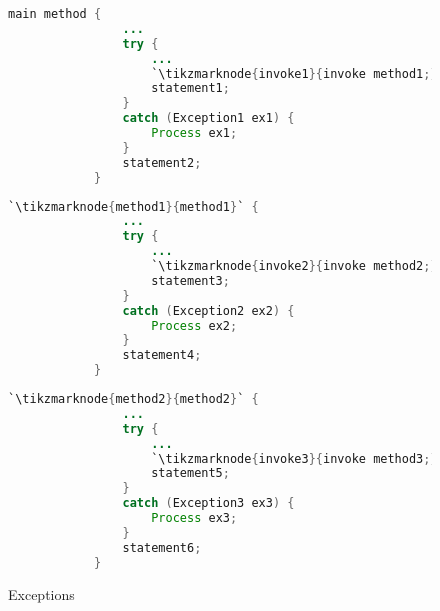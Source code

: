 \documentclass[11pt]{article}
\begin{document}
		\begin{figure}[h!]
			\caption{Exceptions}
	\begin{minipage}{0.28\textwidth}
		\begin{lstlisting}[language=java, frame=single, escapechar=`]
			main method {
				...
				try {
					...
					`\tikzmarknode{invoke1}{invoke method1;}`
					statement1;
				}
				catch (Exception1 ex1) {
					Process ex1;
				}
				statement2;
			}
		\end{lstlisting}
	\end{minipage}
	\hspace{0.5cm}
	\begin{minipage}{0.28\textwidth}
		\begin{lstlisting}[language=java, frame=single, escapechar=`]
			`\tikzmarknode{method1}{method1}` {
				...
				try {
					...
					`\tikzmarknode{invoke2}{invoke method2;}`
					statement3;
				}
				catch (Exception2 ex2) {
					Process ex2;
				}
				statement4;
			}
		\end{lstlisting}
	\end{minipage}
	\hspace{0.5cm}
	\begin{minipage}{0.28\textwidth}
		\begin{lstlisting}[language=java, frame=single, escapechar=`]
			`\tikzmarknode{method2}{method2}` {
				...
				try {
					...
					`\tikzmarknode{invoke3}{invoke method3;}`
					statement5;
				}
				catch (Exception3 ex3) {
					Process ex3;
				}
				statement6;
			}
		\end{lstlisting}
	\end{minipage}

		\end{figure}
\end{document}
